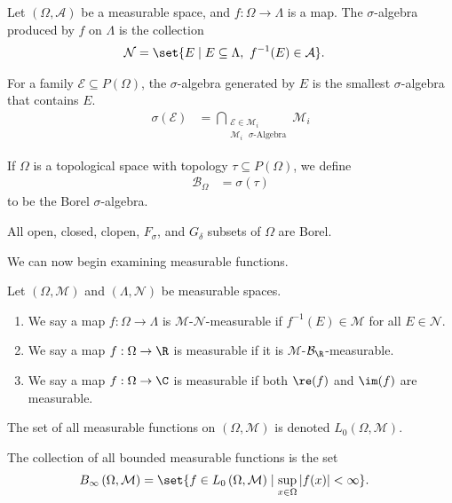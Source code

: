 \begin{definition}
Let $\left(\Omega,\mathcal{A}\right)$ be a measurable space, and $f: \Omega\rightarrow \Lambda$ is a map. The $\sigma$-algebra produced by $f$ on $\Lambda$ is the collection
\begin{align*}
  \mathcal{N} &= \set{E\mid E\subseteq \Lambda,~f^{-1}(E) \in \mathcal{A}}.
\end{align*}

\end{definition}

\begin{definition}
  For a family $\mathcal{E}\subseteq P\left(\Omega\right)$, the $\sigma$-algebra generated by $E$ is the smallest $\sigma$-algebra that contains $E$.
  \begin{align*}
    \sigma\left(\mathcal{E}\right) &= \bigcap_{\substack{\mathcal{E}\in \mathcal{M}_i \\ \text{$\mathcal{M}_i$ $\sigma$-Algebra}}} \mathcal{M}_i
  \end{align*}
\end{definition}
\begin{definition}
  If $\Omega$ is a topological space with topology $\tau\subseteq P(\Omega)$, we define
  \begin{align*}
    \mathcal{B}_{\Omega} &= \sigma\left(\tau\right)
  \end{align*}
  to be the Borel $\sigma$-algebra.
\end{definition}
All open, closed, clopen, $F_{\sigma}$, and $G_{\delta}$ subsets of $\Omega$ are Borel.\break

We can now begin examining measurable functions.
\begin{definition}
  Let $\left(\Omega,\mathcal{M}\right)$ and $\left(\Lambda,\mathcal{N}\right)$ be measurable spaces.
  \begin{enumerate}[(1)]
    \item We say a map $f: \Omega\rightarrow \Lambda$ is $\mathcal{M}$-$\mathcal{N}$-measurable if $f^{-1}\left(E\right)\in \mathcal{M}$ for all $E\in \mathcal{N}$.
    \item We say a map $f: \Omega\rightarrow \R$ is measurable if it is $\mathcal{M}$-$\mathcal{B}_{\R}$-measurable.
    \item We say a map $f: \Omega\rightarrow \C$ is measurable if both $\re(f)$ and $\im(f)$ are measurable.
  \end{enumerate}
  The set of all measurable functions on $\left(\Omega,\mathcal{M}\right)$ is denoted $L_{0}\left(\Omega,\mathcal{M}\right)$.\newline

  The collection of all bounded measurable functions is the set
  \begin{align*}
    B_{\infty}\left(\Omega,\mathcal{M}\right) &= \set{f\in L_0\left(\Omega,\mathcal{M}\right)\mid \sup_{x\in\Omega}\left\vert f(x) \right\vert < \infty}.
  \end{align*}
\end{definition}

